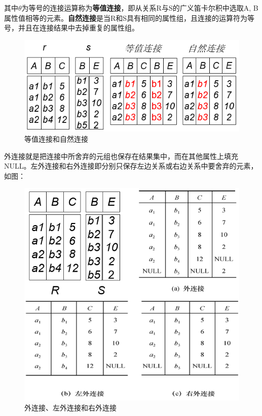 \documentclass[main.tex]{subfiles}
\begin{document}
其中$ \theta $为等号的连接运算称为{\bfseries 等值连接}，即从关系R与S的广义笛卡尔积中选取A, B属性值相等的元素。{\bfseries 自然连接}是当R和S具有相同的属性组，且连接的运算符为等号，并且在连接结果中去掉重复的属性组。\\
\begin{figure}[H]
    \centering
    \includegraphics[scale=0.25]{./images/0029.png}
    \caption{等值连接和自然连接}
\end{figure}
外连接就是把连接中所舍弃的元组也保存在结果集中，而在其他属性上填充NULL。左外连接和右外连接即分别只保存左边关系或右边关系中要舍弃的元素，如图：\\
\begin{figure}[H]
    \centering
    \includegraphics[scale=0.25]{./images/0030.png}
    \caption{外连接、左外连接和右外连接}
\end{figure}
\end{document}
